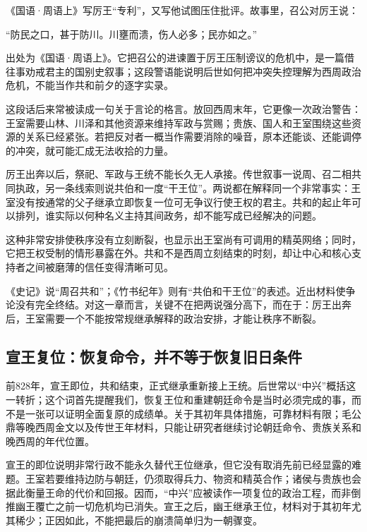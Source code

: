 《国语·周语上》写厉王“专利”，又写他试图压住批评。故事里，召公对厉王说：

\begin{textwindow}[声音与河水]
“防民之口，甚于防川。川壅而溃，伤人必多；民亦如之。”

出处为《国语·周语上》。它把召公的进谏置于厉王压制谤议的危机中，是一篇借往事劝戒君主的国别史叙事；这段警语能说明后世如何把冲突失控理解为西周政治危机，不能当作共和前夕的逐字实录。
\end{textwindow}

这段话后来常被读成一句关于言论的格言。放回西周末年，它更像一次政治警告：王室需要山林、川泽和其他资源来维持军政与赏赐；贵族、国人和王室围绕这些资源的关系已经紧张。若把反对者一概当作需要消除的噪音，原本还能谈、还能调停的冲突，就可能汇成无法收拾的力量。

厉王出奔以后，祭祀、军政与王统不能长久无人承接。传世叙事一说周、召二相共同执政，另一条线索则说共伯和一度“干王位”。两说都在解释同一个非常事实：王室没有按通常的父子继承立即恢复一位可无争议行使王权的君主。共和的起止年可以排列，谁实际以何种名义主持其间政务，却不能写成已经解决的问题。

这种非常安排使秩序没有立刻断裂，也显示出王室尚有可调用的精英网络；同时，它把王权受制的情形暴露在外。共和不是西周立刻结束的时刻，却让中心和核心支持者之间被磨薄的信任变得清晰可见。

\begin{debate}[“共和”是谁在执政]
《史记》说“周召共和”；《竹书纪年》则有“共伯和干王位”的表述。近出材料使争论没有完全终结。对这一章而言，关键不在把两说强分高下，而在于：厉王出奔后，王室需要一个不能按常规继承解释的政治安排，才能让秩序不断裂。
\end{debate}

\subsection{宣王复位：恢复命令，并不等于恢复旧日条件}

前828年，宣王即位，共和结束，正式继承重新接上王统。后世常以“中兴”概括这一转折；这个词首先提醒我们，恢复王位和重建朝廷命令是当时必须完成的事，而不是一张可以证明全面复原的成绩单。关于其初年具体措施，可靠材料有限；毛公鼎等晚西周金文以及传世王年材料，只能让研究者继续讨论朝廷命令、贵族关系和晚西周的年代位置。

宣王的即位说明非常行政不能永久替代王位继承，但它没有取消先前已经显露的难题。王室若要维持边防与朝廷，仍须取得兵力、物资和精英合作；诸侯与贵族也会据此衡量王命的代价和回报。因而，“中兴”应被读作一项复位的政治工程，而非倒推幽王覆亡之前一切危机均已消失。宣王之后，幽王继承王位，材料对于其初年尤其稀少；正因如此，不能把最后的崩溃简单归为一朝骤变。

